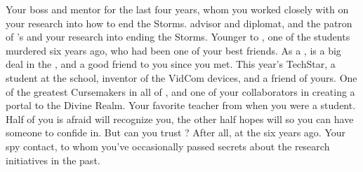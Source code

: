 \documentclass[char]{GL2020}
\begin{document}
\begin{contacts}
    \contact{\cHeadScientist{}} Your boss and mentor for the last four years, whom you worked closely with on your research into how to end the Storms. 
    \contact{\cDiplomat{}} \pTech{} advisor and diplomat, and the patron of \cHeadScientist{}'s and your research into ending the Storms.
    \contact{\cHeir{}} Younger \cHeir{\sibling} to \cHeirSibling{}, one of the students murdered six years ago, who had been one of your best friends. As a \cHeir{\formal}, \cHeir{} is a big deal in the \pTech{}, and a good friend to you since you met.
    \contact{\cTechStar{}} This year's TechStar, a student at the school, inventor of the VidCom devices, and a friend of yours. 
    \contact{\cCurse{}} One of the greatest Cursemakers in all of \pEarth{}, and one of your collaborators in creating a portal to the Divine Realm.
    \contact{\cMusic{}} Your favorite teacher from when you were a student. Half of you is afraid \cMusic{\they} will recognize you, the other half hopes \cMusic{\they} will so you can have someone to confide in. But can you trust \cMusic{\them}? After all, \cMusic{\theywere} at the \pSc{} six years ago.
    \contact{\cBunker{}} Your \pShippie{} spy contact, to whom you've occasionally passed secrets about the \pTech{} research initiatives in the past. 
\end{contacts}
\end{document}
